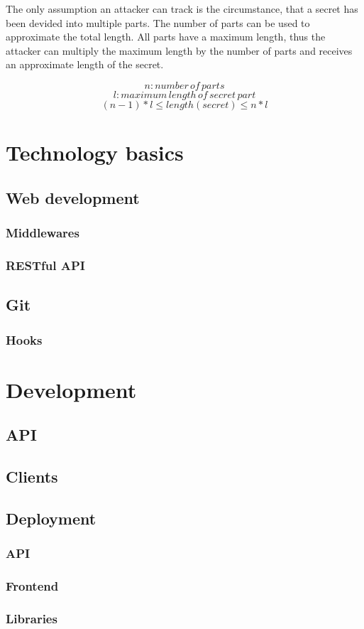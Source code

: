 The only assumption an attacker can track is the circumstance, that a secret
has been devided into multiple parts. The number of parts can be used to
approximate the total length. All parts have a maximum length, thus the
attacker can multiply the maximum length by the number of parts and receives an
approximate length of the secret.

$$n: number\,of\,parts$$
$$l: maximum\,length\,of\,secret\,part$$
$$(n - 1) * l \leq length(secret) \leq n * l$$

\chapter{Technology basics}
\section{Web development}
\subsection{Middlewares}
\subsection{RESTful API}
\section{Git}
\subsection{Hooks}

\chapter{Development}
\section{API}
\section{Clients}
\section{Deployment}
\subsection{API}
\subsection{Frontend}
\subsection{Libraries}
